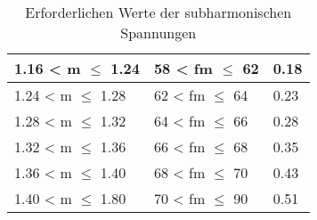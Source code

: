 \begin{appendix}
\begin{table}[ht!]
\begin{tabular}{|l|l|l|}
		1.16 < m $\leq$ 1.24                                                                            & 58 < fm $\leq$ 62                                                                                                    & 0.18                        \\ \hline
		1.24 < m $\leq$ 1.28                                                                            & 62 < fm $\leq$ 64                                                                                                    & 0.23                        \\ \hline
		1.28 < m $\leq$ 1.32                                                                            & 64 < fm $\leq$ 66                                                                                                    & 0.28                        \\ \hline
		1.32 < m $\leq$ 1.36                                                                            & 66 < fm $\leq$ 68                                                                                                    & 0.35                        \\ \hline
		1.36 < m $\leq$ 1.40                                                                             & 68 < fm $\leq$ 70                                                                                                    & 0.43                        \\ \hline
		1.40 < m $\leq$ 1.80                                                                              & 70 < fm $\leq$ 90                                                                                                    & 0.51                        \\ \hline
	\end{tabular}
	\caption{Erforderlichen Werte der subharmonischen Spannungen}\label{tab:subharmonische_Spannung_ZF}
\end{table}


\end{appendix}

